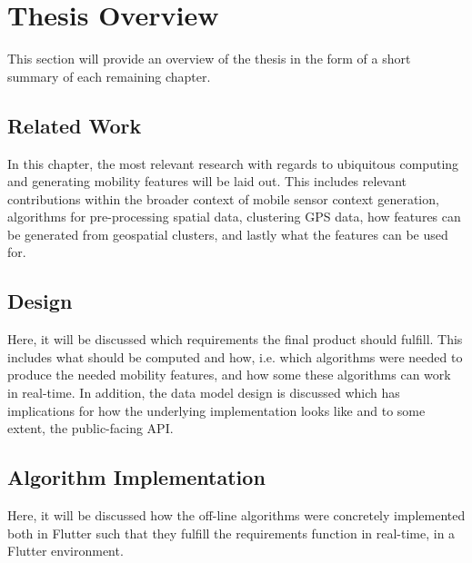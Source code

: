 \section{Thesis Overview}
This section will provide an overview of the thesis in the form of a short summary of each remaining chapter.

\subsection{Related Work}
In this chapter, the most relevant research with regards to ubiquitous computing and generating mobility features will be laid out. This includes relevant contributions within the broader context of mobile sensor context generation, algorithms for pre-processing spatial data, clustering GPS data, how features can be generated from geospatial clusters, and lastly what the features can be used for.

\subsection{Design}
Here, it will be discussed which requirements the final product should fulfill. This includes what should be computed and how, i.e. which algorithms were needed to produce the needed mobility features, and how some these algorithms can work in real-time. In addition, the data model design is discussed which has implications for how the underlying implementation looks like and to some extent, the public-facing API.

\subsection{Algorithm Implementation}
Here, it will be discussed how the off-line algorithms were concretely implemented both in Flutter such that they fulfill the requirements function in real-time, in a Flutter environment.

